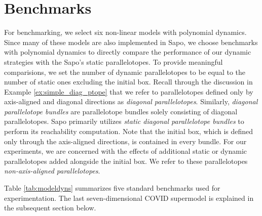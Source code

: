 \section{Benchmarks}
\label{sec:benchmarks}
For benchmarking, we select six non-linear models with polynomial dynamics.
%
Since many of these models are also implemented in Sapo, we choose benchmarks with polynomial dynamics to directly compare the performance of our dynamic strategies with the Sapo's static parallelotopes. To provide meaningful comparisions, we set the number of dynamic parallelotopes to be equal to the number of static ones excluding the initial box.
%
Recall through the discussion in Example \ref{ex:simple_diag_ptope} that we refer to parallelotopes defined only by axis-aligned and diagonal directions as \emph{diagonal parallelotopes}.
%
Similarly, \emph{diagonal parallelotope bundles} are parallelotope bundles solely consisting of diagonal parallelotopes. Sapo primarily utilizes \emph{static diagonal parallelotope bundles} to perform its reachability computation.
%
Note that the initial box, which is defined only through the axis-aligned directions, is contained in every bundle.
%
For our experiments, we are concerned with the effects of additional static or dynamic parallelotopes added alongside the initial box. We refer to these parallelotopes \emph{non-axis-aligned parallelotopes}.

Table \ref{tab:modeldyns} summarizes five standard benchmarks used for experimentation. The last seven-dimensional COVID supermodel is explained in the subsequent section below.





